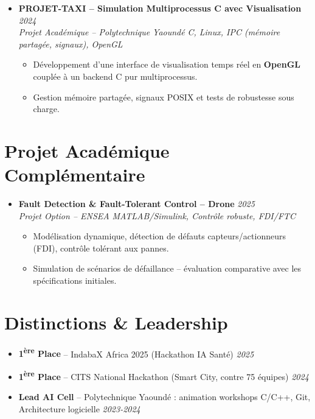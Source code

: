 \documentclass[a4paper,11pt]{article}
\begin{document}
\begin{itemize}[leftmargin=*, label={-}]
\item \textbf{PROJET-TAXI -- Simulation Multiprocessus C avec Visualisation} \hfill \textit{2024} \\
\textit{Projet Académique -- Polytechnique Yaoundé} \hfill \textit{C, Linux, IPC (mémoire partagée, signaux), OpenGL}
\vspace{-2pt}
    \begin{itemize}[leftmargin=0.4cm, nosep, label=\tiny$\bullet$]
        \item \small{Développement d'une interface de visualisation temps réel en \textbf{OpenGL} couplée à un backend C pur multiprocessus.}
        \item \small{Gestion mémoire partagée, signaux POSIX et tests de robustesse sous charge.}
    \end{itemize}

\end{itemize}

\section{Projet Académique Complémentaire}
\begin{itemize}[leftmargin=*, label={-}]

\item \textbf{Fault Detection \& Fault-Tolerant Control -- Drone} \hfill \textit{2025} \\
\textit{Projet Option -- ENSEA} \hfill \textit{MATLAB/Simulink, Contrôle robuste, FDI/FTC}
\vspace{-2pt}
    \begin{itemize}[leftmargin=0.4cm, nosep, label=\tiny$\bullet$]
        \item \small{Modélisation dynamique, détection de défauts capteurs/actionneurs (FDI), contrôle tolérant aux pannes.}
        \item \small{Simulation de scénarios de défaillance -- évaluation comparative avec les spécifications initiales.}
    \end{itemize}

\end{itemize}

\section{Distinctions \& Leadership}
\begin{itemize}[leftmargin=*, label=\tiny$\bullet$, nosep]
    \item \textbf{1\textsuperscript{ère} Place} -- IndabaX Africa 2025 (Hackathon IA Santé) \hfill \textit{2025}
    \item \textbf{1\textsuperscript{ère} Place} -- CITS National Hackathon (Smart City, contre 75 équipes) \hfill \textit{2024}
    \item \textbf{Lead AI Cell} -- Polytechnique Yaoundé : animation workshops C/C++, Git, Architecture logicielle \hfill \textit{2023-2024}
\end{itemize}
\end{document}
